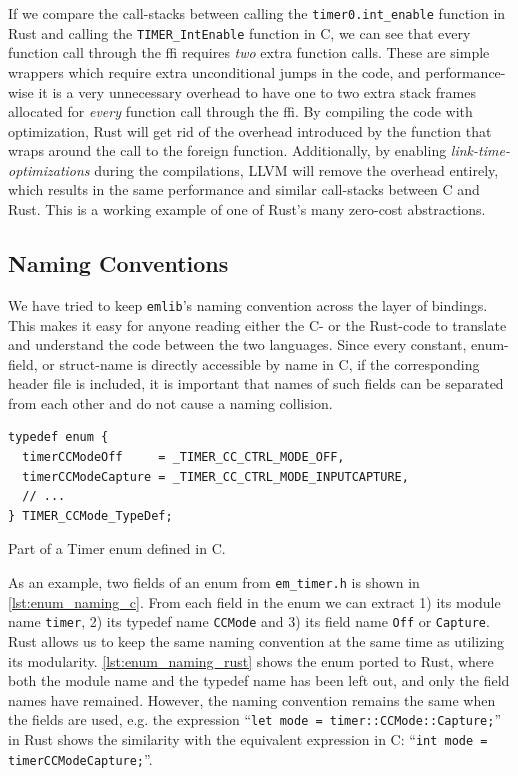 If we compare the call-stacks between calling the \texttt{timer0.int\_enable} function in Rust and calling the \texttt{TIMER\_IntEnable} function in C, we can see that every function call through the \gls{ffi} requires \emph{two} extra function calls.
These are simple wrappers which require extra unconditional jumps in the code, and performance-wise it is a very unnecessary overhead to have one to two extra stack frames allocated for \emph{every} function call through the \gls{ffi}.
By compiling the code with optimization, Rust will get rid of the overhead introduced by the function that wraps around the call to the foreign function.
Additionally, by enabling \emph{link-time-optimizations} during the compilations, LLVM will remove the overhead entirely, which results in the same performance and similar call-stacks between C and Rust.
This is a working example of one of Rust's many zero-cost abstractions.

\subsection{Naming Conventions}

We have tried to keep \texttt{emlib}'s naming convention across the layer of bindings.
This makes it easy for anyone reading either the C- or the Rust-code to translate and understand the code between the two languages.
Since every constant, enum-field, or struct-name is directly accessible by name in C, if the corresponding header file is included, it is important that names of such fields can be separated from each other and do not cause a naming collision.

\begin{listing}[h]
\begin{verbatim}
typedef enum {
  timerCCModeOff     = _TIMER_CC_CTRL_MODE_OFF,
  timerCCModeCapture = _TIMER_CC_CTRL_MODE_INPUTCAPTURE,
  // ...
} TIMER_CCMode_TypeDef;
\end{verbatim}
\caption{Part of a Timer enum defined in C.}
\label{lst:enum_naming_c}
\end{listing}

As an example, two fields of an enum from \texttt{em\_timer.h} is shown in \autoref{lst:enum_naming_c}.
From each field in the enum we can extract 1) its module name \texttt{timer}, 2) its typedef name \texttt{CCMode} and 3) its field name \texttt{Off} or \texttt{Capture}.
Rust allows us to keep the same naming convention at the same time as utilizing its modularity.
\autoref{lst:enum_naming_rust} shows the enum ported to Rust, where both the module name and the typedef name has been left out, and only the field names have remained.
However, the naming convention remains the same when the fields are used, e.g. the expression ``\texttt{let mode = timer::CCMode::Capture;}'' in Rust shows the similarity with the equivalent expression in C: ``\texttt{int mode = timerCCModeCapture;}''.

